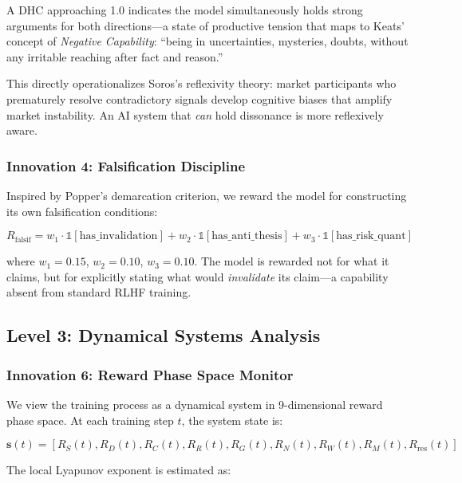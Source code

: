 \documentclass{article}
\begin{document}
A DHC approaching 1.0 indicates the model simultaneously holds strong arguments for both directions---a state of productive tension that maps to Keats' concept of \emph{Negative Capability}: ``being in uncertainties, mysteries, doubts, without any irritable reaching after fact and reason.''

This directly operationalizes Soros's reflexivity theory: market participants who prematurely resolve contradictory signals develop cognitive biases that amplify market instability. An AI system that \emph{can} hold dissonance is more reflexively aware.

\subsubsection{Innovation 4: Falsification Discipline}

Inspired by Popper's demarcation criterion, we reward the model for constructing its own falsification conditions:

\begin{equation}
    R_{\text{falsif}} = w_1 \cdot \mathbb{1}[\text{has\_invalidation}] + w_2 \cdot \mathbb{1}[\text{has\_anti\_thesis}] + w_3 \cdot \mathbb{1}[\text{has\_risk\_quant}]
\end{equation}

where $w_1 = 0.15$, $w_2 = 0.10$, $w_3 = 0.10$. The model is rewarded not for what it claims, but for explicitly stating what would \emph{invalidate} its claim---a capability absent from standard RLHF training.

\subsection{Level 3: Dynamical Systems Analysis}
\label{sec:phase}

\subsubsection{Innovation 6: Reward Phase Space Monitor}

We view the training process as a dynamical system in 9-dimensional reward phase space. At each training step $t$, the system state is:

\begin{equation}
    \mathbf{s}(t) = [R_S(t), R_D(t), R_C(t), R_R(t), R_G(t), R_N(t), R_W(t), R_M(t), R_{\text{res}}(t)]
\end{equation}

The local Lyapunov exponent is estimated as:
\end{document}
